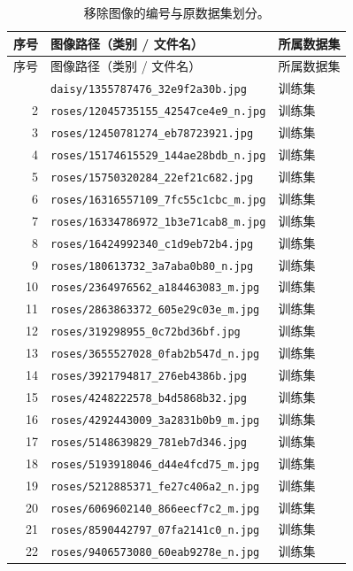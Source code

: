 \documentclass[11pt,a4paper,UTF8,fontset=windows]{ctexart}
\begin{document}
\begin{longtable}{rll}
\caption{移除图像的编号与原数据集划分。}\label{tab:removed-images}\\
\toprule
序号 & 图像路径（类别 / 文件名） & 所属数据集 \\
\midrule
\endfirsthead
\toprule
序号 & 图像路径（类别 / 文件名） & 所属数据集 \\
\midrule
\endhead
\bottomrule
\endfoot
1 & \texttt{daisy/1355787476\_32e9f2a30b.jpg} & 训练集 \\
2 & \texttt{roses/12045735155\_42547ce4e9\_n.jpg} & 训练集 \\
3 & \texttt{roses/12450781274\_eb78723921.jpg} & 训练集 \\
4 & \texttt{roses/15174615529\_144ae28bdb\_n.jpg} & 训练集 \\
5 & \texttt{roses/15750320284\_22ef21c682.jpg} & 训练集 \\
6 & \texttt{roses/16316557109\_7fc55c1cbc\_m.jpg} & 训练集 \\
7 & \texttt{roses/16334786972\_1b3e71cab8\_m.jpg} & 训练集 \\
8 & \texttt{roses/16424992340\_c1d9eb72b4.jpg} & 训练集 \\
9 & \texttt{roses/180613732\_3a7aba0b80\_n.jpg} & 训练集 \\
10 & \texttt{roses/2364976562\_a184463083\_m.jpg} & 训练集 \\
11 & \texttt{roses/2863863372\_605e29c03e\_m.jpg} & 训练集 \\
12 & \texttt{roses/319298955\_0c72bd36bf.jpg} & 训练集 \\
13 & \texttt{roses/3655527028\_0fab2b547d\_n.jpg} & 训练集 \\
14 & \texttt{roses/3921794817\_276eb4386b.jpg} & 训练集 \\
15 & \texttt{roses/4248222578\_b4d5868b32.jpg} & 训练集 \\
16 & \texttt{roses/4292443009\_3a2831b0b9\_m.jpg} & 训练集 \\
17 & \texttt{roses/5148639829\_781eb7d346.jpg} & 训练集 \\
18 & \texttt{roses/5193918046\_d44e4fcd75\_m.jpg} & 训练集 \\
19 & \texttt{roses/5212885371\_fe27c406a2\_n.jpg} & 训练集 \\
20 & \texttt{roses/6069602140\_866eecf7c2\_m.jpg} & 训练集 \\
21 & \texttt{roses/8590442797\_07fa2141c0\_n.jpg} & 训练集 \\
22 & \texttt{roses/9406573080\_60eab9278e\_n.jpg} & 训练集 \\

\end{longtable}
\end{document}
